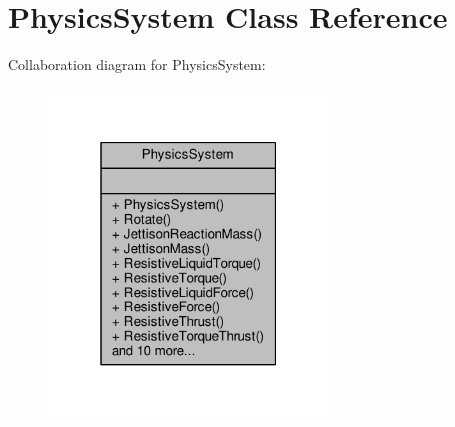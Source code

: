 \hypertarget{classPhysicsSystem}{}\section{Physics\+System Class Reference}
\label{classPhysicsSystem}


Collaboration diagram for Physics\+System\+:
\nopagebreak
\begin{figure}[H]
\begin{center}
\leavevmode
\includegraphics[width=211pt]{d9/d46/classPhysicsSystem__coll__graph}
\end{center}
\end{figure}
